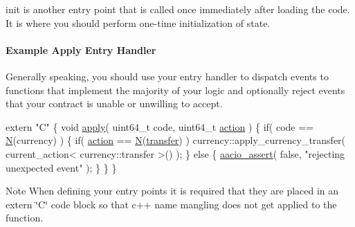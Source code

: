 {\ttfamily init} is another entry point that is called once immediately after loading the code. It is where you should perform one-\/time initialization of state.

\paragraph*{Example Apply Entry Handler}

Generally speaking, you should use your entry handler to dispatch events to functions that implement the majority of your logic and optionally reject events that your contract is unable or unwilling to accept.


\begin{DoxyCode}
\textcolor{keyword}{extern} \textcolor{stringliteral}{"C"} \{
   \textcolor{keywordtype}{void} \mbox{\hyperlink{aacio_8system_8cpp_abdb22838286244938c6192c2a2263d9c}{apply}}( uint64\_t code, uint64\_t \mbox{\hyperlink{structaction}{action}} ) \{
      \textcolor{keywordflow}{if}( code == \mbox{\hyperlink{group__types_gaf9c1edb0e0da55ec6ba09f32f6839529}{N}}(currency) ) \{
         \textcolor{keywordflow}{if}( \mbox{\hyperlink{structaction}{action}} == \mbox{\hyperlink{group__types_gaf9c1edb0e0da55ec6ba09f32f6839529}{N}}(\mbox{\hyperlink{namespacetransfer}{transfer}}) ) 
            currency::apply\_currency\_transfer( current\_action< currency::transfer >() );
      \} \textcolor{keywordflow}{else} \{
         \mbox{\hyperlink{group__systemcapi_gaf5c36ddbe4ddd977456ac9aefcdb923f}{aacio\_assert}}( \textcolor{keyword}{false}, \textcolor{stringliteral}{"rejecting unexpected event"} );
      \}
   \}
\}
\end{DoxyCode}


\begin{DoxyNote}{Note}
When defining your entry points it is required that they are placed in an {\ttfamily extern \char`\"{}\+C\char`\"{}} code block so that c++ name mangling does not get applied to the function. 
\end{DoxyNote}
